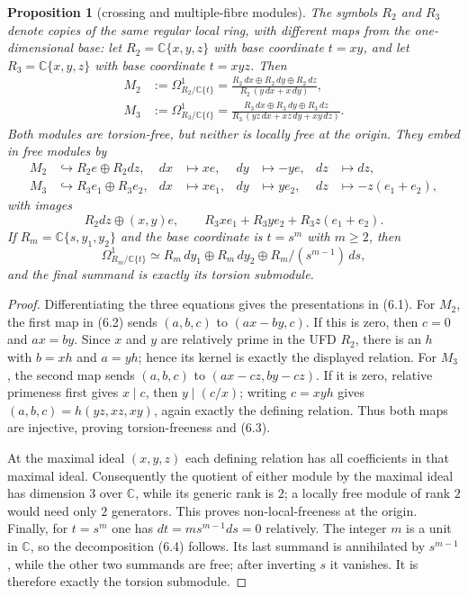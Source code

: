 \documentclass[11pt]{amsart}
\newcommand{\C}{\mathbb C}
\theoremstyle{plain}
\newtheorem{proposition}[theorem]{Proposition}
\theoremstyle{definition}
\theoremstyle{remark}
\begin{document}
\begin{proposition}[crossing and multiple-fibre modules]
\label{prop:relative-local}
The symbols $R_2$ and $R_3$ denote copies of the same regular local ring,
with different maps from the one-dimensional base:
let $R_2=\C\{x,y,z\}$ with base coordinate $t=xy$, and let
$R_3=\C\{x,y,z\}$ with base coordinate $t=xyz$.  Then
\[
\begin{aligned}
 M_2&:=\Omega^1_{R_2/\C\{t\}}
 =\frac{R_2\,dx\oplus R_2\,dy\oplus R_2\,dz}
        {R_2\,(y\,dx+x\,dy)},\\[2pt]
 M_3&:=\Omega^1_{R_3/\C\{t\}}
 =\frac{R_3\,dx\oplus R_3\,dy\oplus R_3\,dz}
        {R_3\,(yz\,dx+xz\,dy+xy\,dz)}.
\end{aligned}
\tag{6.1}
\]
Both modules are torsion-free, but neither is locally free at the origin.
They embed in free modules by
\[
\begin{aligned}
 M_2&\hookrightarrow R_2e\oplus R_2dz,
 &dx&\longmapsto xe,&dy&\longmapsto-ye,&dz&\longmapsto dz,\\
 M_3&\hookrightarrow R_3e_1\oplus R_3e_2,
 &dx&\longmapsto xe_1,&dy&\longmapsto ye_2,&dz&\longmapsto-z(e_1+e_2),
\end{aligned}
\tag{6.2}
\]
with images
\[
 R_2dz\oplus (x,y)e,
 \qquad
 R_3xe_1+R_3ye_2+R_3z(e_1+e_2).
\tag{6.3}
\]
If $R_m=\C\{s,y_1,y_2\}$ and the base coordinate is $t=s^m$ with
$m\ge2$, then
\[
\Omega^1_{R_m/\C\{t\}}
\simeq R_m\,dy_1\oplus R_m\,dy_2
       \oplus R_m/(s^{m-1})\,ds,
\tag{6.4}
\]
and the final summand is exactly its torsion submodule.
\end{proposition}

\begin{proof}
Differentiating the three equations gives the presentations in (6.1).  For
$M_2$, the first map in (6.2) sends $(a,b,c)$ to $(ax-by,c)$.  If this is
zero, then $c=0$ and $ax=by$.  Since $x$ and $y$ are relatively prime in the
UFD $R_2$, there is an $h$ with $b=xh$ and $a=yh$; hence its kernel is exactly
the displayed relation.  For $M_3$, the second map sends $(a,b,c)$ to
$(ax-cz,by-cz)$.  If it is zero, relative primeness first gives $x\mid c$,
then $y\mid(c/x)$; writing $c=xyh$ gives
$(a,b,c)=h(yz,xz,xy)$, again exactly the defining relation.  Thus both maps
are injective, proving torsion-freeness and (6.3).

At the maximal ideal $(x,y,z)$ each defining relation has all coefficients in
that maximal ideal.  Consequently the quotient of either module by the
maximal ideal has dimension $3$ over $\C$, while its generic rank is $2$;
a locally free module of rank $2$ would need only $2$ generators.  This proves
non-local-freeness at the origin.  Finally, for $t=s^m$ one has
$dt=m s^{m-1}ds=0$ relatively.  The integer $m$ is a unit in $\C$, so the
decomposition (6.4) follows.  Its last summand is annihilated by
$s^{m-1}$, while the other two summands are free; after inverting $s$ it
vanishes.  It is therefore exactly the torsion submodule.
\end{proof}
\end{document}
